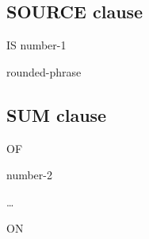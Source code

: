 \subsection{SOURCE clause}
 IS number-1
\begin{0-1}
  rounded-phrase
\end{0-1}

\subsection{SUM clause}
 OF
\begin{1=}
  number-2
\end{1=}\ldots
\begin{0-1}
   ON
  \begin{1=}
    \identifier \\
  \end{1=}
\end{0-1}

